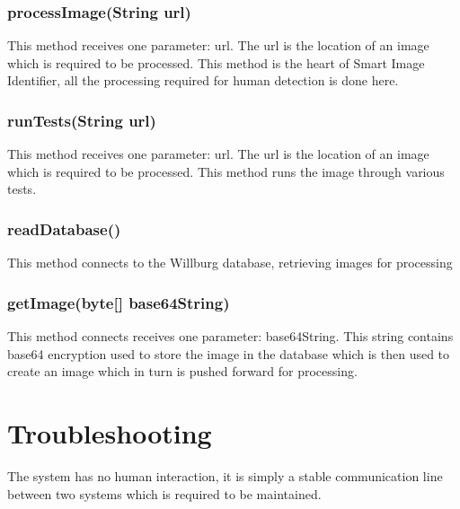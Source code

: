 \documentclass[a4paper,12pt]{report}
\begin{document}
\subsubsection{processImage(String url)}
This method receives one parameter: url. The url is the location of an image which is
required to be processed.
This method is the heart of Smart Image Identifier, all the processing required for human
detection is done here.
\subsubsection{runTests(String url)}
This method receives one parameter: url. The url is the location of an image which is required to be processed.
This method runs the image through various tests.

\subsubsection{readDatabase()}
This method connects to the Willburg database, retrieving images for processing
\subsubsection{getImage(byte[] base64String)}
This method connects receives one parameter: base64String. This string contains base64 encryption used to store the image in the database which is then used to create an image which in turn is pushed forward for processing.
\pagebreak
\section{Troubleshooting}
The system has no human interaction, it is simply a stable communication line between two systems which is required to be maintained.
\end{document}
